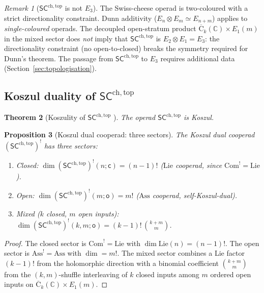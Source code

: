 \documentclass[11pt,reqno]{amsart}
\newtheorem{theorem}{Theorem}[section]
\newtheorem{proposition}[theorem]{Proposition}
\theoremstyle{definition}
\theoremstyle{remark}
\newtheorem{remark}[theorem]{Remark}
\providecommand{\FM}{\overline{\mathrm{C}}}
\providecommand{\Eone}{E_1}
\providecommand{\Etwo}{E_2}
\providecommand{\Ethree}{E_3}
\providecommand{\En}{E_n}
\providecommand{\SCchtop}{\ensuremath{\mathsf{SC}^{\mathrm{ch,top}}}}
\providecommand{\bC}{\mathbb{C}}
\begin{document}
\begin{remark}[$\SCchtop$ is not $\Ethree$]
\label{rem:e-sc-not-e3}
The Swiss-cheese operad is two-coloured with a strict
directionality constraint. Dunn additivity
($\En \otimes E_m \simeq E_{n+m}$) applies to
\emph{single-coloured} operads. The decoupled open-stratum product
$\FM_k(\bC) \times \Eone(m)$ in the mixed sector does
\emph{not} imply that $\SCchtop$ is $\Etwo \otimes \Eone = \Ethree$:
the directionality constraint (no open-to-closed) breaks the
symmetry required for Dunn's theorem. The passage from
$\SCchtop$ to $\Ethree$ requires additional data
(Section~\ref{sec:topologisation}).
\end{remark}

\subsection{Koszul duality of $\SCchtop$}

\begin{theorem}[Koszulity of $\SCchtop$
\textup{\cite{Livernet06}}]
\label{thm:e-sc-koszul}
The operad $\SCchtop$ is Koszul.
\end{theorem}

\begin{proposition}[Koszul dual cooperad: three sectors]
\label{prop:e-sc-dual}
The Koszul dual cooperad $(\SCchtop)^!$ has three sectors:
\begin{enumerate}[label=\textup{(\roman*)}]
\item \emph{Closed:}
 $\dim(\SCchtop)^!(n;\mathsf{c}) = (n{-}1)!$
 \quad\textup{(}$\mathrm{Lie}$ cooperad, since
 $\mathrm{Com}^! = \mathrm{Lie}$\textup{)}.
\item \emph{Open:}
 $\dim(\SCchtop)^!(m;\mathsf{o}) = m!$
 \quad\textup{(}$\mathrm{Ass}$ cooperad,
 self-Koszul-dual\textup{)}.
\item \emph{Mixed} ($k$ closed, $m$ open inputs):
 $\dim(\SCchtop)^!(k,m;\mathsf{o}) =
 (k{-}1)!\,\binom{k+m}{m}$.
\end{enumerate}
\end{proposition}

\begin{proof}
The closed sector is $\mathrm{Com}^! = \mathrm{Lie}$ with
$\dim\mathrm{Lie}(n) = (n{-}1)!$. The open sector is
$\mathrm{Ass}^! = \mathrm{Ass}$ with $\dim = m!$. The mixed
sector combines a Lie factor $(k{-}1)!$ from the holomorphic
direction with a binomial coefficient $\binom{k+m}{m}$ from the
$(k,m)$-shuffle interleaving of $k$ closed inputs among $m$
ordered open inputs on $\FM_k(\bC) \times \Eone(m)$.
\end{proof}
\end{document}
